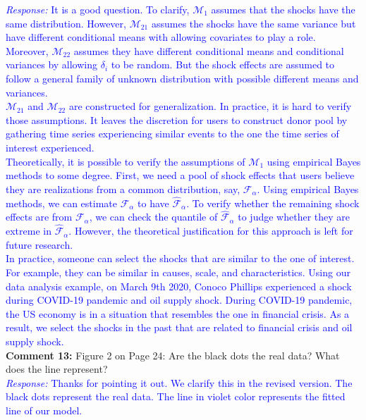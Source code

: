 \documentclass[12pt]{article}
\newcommand{\response}[1]{\noindent \textcolor{blue}{\emph{Response:} #1}}
\begin{document}
\response{It is a good question. To clarify, $\mathcal{M}_1$ assumes that the shocks have the same distribution. However, $\mathcal{M}_{21}$ assumes the shocks have the same variance but have different conditional means with allowing covariates to play a role. Moreover, $\mathcal{M}_{22}$ assumes they have different conditional means and conditional variances by allowing $\delta_i$ to be random. But the shock effects are assumed to follow a general family of  unknown distribution with possible different means and variances.\\

$\mathcal{M}_{21}$ and $\mathcal{M}_{22}$ are constructed for generalization. In practice, it is hard to verify those assumptions. It leaves the discretion for users to construct donor pool by gathering time series experiencing similar events to the one the time series of interest experienced. \\

Theoretically, it is possible to verify the assumptions of $\mathcal{M}_{1}$ using empirical Bayes methods to some degree. First, we need a  pool of shock effects that users believe they are realizations from a common distribution, say, $\mathcal{F}_{\alpha}$. Using empirical Bayes methods, we can estimate $\mathcal{F}_{\alpha}$ to have $\hat{\mathcal{F}}_{\alpha}$. To verify whether the remaining shock effects are from $\mathcal{F}_{\alpha}$, we can check the quantile of $\hat{\mathcal{F}}_{\alpha}$ to judge whether they are extreme in $\hat{\mathcal{F}}_{\alpha}$. However, the theoretical justification for this approach is left for future research. \\

In practice, someone can select the shocks that are similar to the one of interest. For example, they can be similar in causes, scale, and characteristics. Using our data analysis example, on March 9th 2020, Conoco Phillips experienced a shock during COVID-19 pandemic and oil supply shock. During COVID-19 pandemic, the US economy is in a situation that resembles the one in financial crisis. As a result, we select the shocks in the past that are related to financial crisis and oil supply shock.} \\


{\bf Comment 13:} Figure 2 on Page 24: Are the black dots the real data? What does the line represent?\\

\response{Thanks for pointing it out. We  clarify this in the revised version. The black dots represent the real data. The line in violet color represents the fitted line of our model.}
\end{document}
